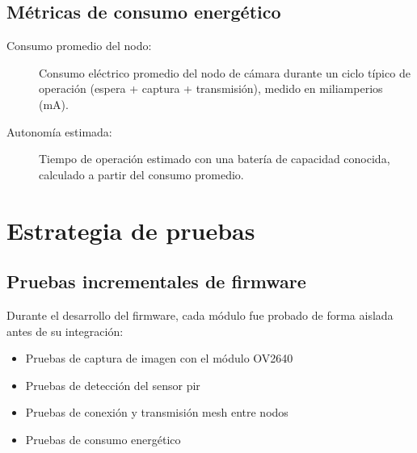 \documentclass[a4paper, 12pt]{report}
\begin{document}


\subsection{Métricas de consumo energético}

\begin{description}
  \item[Consumo promedio del nodo:] Consumo eléctrico promedio del nodo de
    cámara durante un ciclo típico de operación (espera + captura +
    transmisión), medido en miliamperios (\unit{mA}).
  \item[Autonomía estimada:] Tiempo de operación estimado con una batería de
    capacidad conocida, calculado a partir del consumo promedio.
\end{description}

\section{Estrategia de pruebas}

\subsection{Pruebas incrementales de firmware}

Durante el desarrollo del \gls{firmware}, cada módulo fue probado de forma
aislada antes de su integración:

\begin{itemize}
  \item Pruebas de captura de imagen con el módulo OV2640
  \item Pruebas de detección del sensor \gls{pir}
  \item Pruebas de conexión y transmisión \gls{mesh} entre nodos
  \item Pruebas de consumo energético
\end{itemize}
\end{document}
